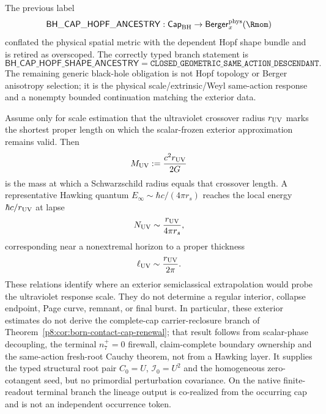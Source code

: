 \documentclass[12pt,a4paper]{article}
\begin{document}
\begin{remark}
\label{p8:rem:strong-field-cap-hopf-ancestry-gap}
The previous label
\[
 \mathsf{BH\_CAP\_HOPF\_ANCESTRY}:
 \mathsf{Cap}_{\rm BH}\to\mathsf{Berger}^{\rm phys}_x(\Rmom)
\]
conflated the physical spatial metric with the dependent Hopf shape bundle and
is retired as overscoped.  The correctly typed branch statement is
\[
 \boxed{
 \mathsf{BH\_CAP\_HOPF\_SHAPE\_ANCESTRY}
 =\texttt{CLOSED\_GEOMETRIC\_SAME\_ACTION\_DESCENDANT}.}
\]
The remaining generic black-hole obligation is not Hopf topology or Berger
anisotropy selection; it is the physical scale/extrinsic/Weyl same-action
response and a nonempty bounded continuation matching the exterior data.
\end{remark}

\begin{proposition}
\label{p8:prop:conditional-exterior-breakdown-scales}
Assume only for scale estimation that the ultraviolet crossover radius
$r_{\rm UV}$ marks the shortest proper length on which the scalar-frozen
exterior approximation remains valid.  Then
\begin{equation}
\label{p8:eq:conditional-core-mass-scale}
 M_{\rm UV}:=\frac{c^2r_{\rm UV}}{2G}
\end{equation}
is the mass at which a Schwarzschild radius equals that crossover length.  A
representative Hawking quantum $E_\infty\sim\hbar c/(4\pi r_s)$ reaches the
local energy $\hbar c/r_{\rm UV}$ at lapse
\begin{equation}
\label{p8:eq:conditional-hawking-lapse}
 N_{\rm UV}\sim\frac{r_{\rm UV}}{4\pi r_s},
\end{equation}
corresponding near a nonextremal horizon to a proper thickness
\begin{equation}
\label{p8:eq:conditional-hawking-layer}
 \ell_{\rm UV}\sim\frac{r_{\rm UV}}{2\pi}.
\end{equation}
These relations identify where an exterior semiclassical extrapolation would
probe the ultraviolet response scale.  They do not determine a regular
interior, collapse endpoint, Page curve, remnant, or final burst.  In particular, these exterior estimates do not
derive the complete-cap carrier-reclosure branch of
Theorem~\ref{p8:cor:born-contact-cap-renewal}; that result follows from
scalar-phase decoupling, the terminal \(n_7^+=0\) firewall, claim-complete
boundary ownership and the same-action fresh-root Cauchy theorem, not from a
Hawking layer.  It supplies the typed structural root pair \(C_0=U\),
\(\mathcal I_0=U^2\) and the homogeneous zero-cotangent seed, but no
primordial perturbation covariance.  On the native finite-readout terminal
branch the lineage output is co-realized from the occurring cap and is not an
independent occurrence token.
\end{proposition}
\end{document}
